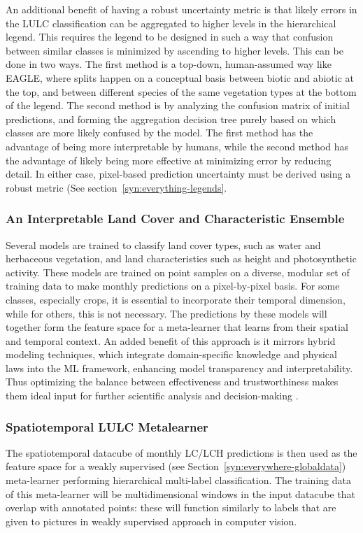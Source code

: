            An additional benefit of having a robust uncertainty metric is that likely errors in the LULC classification can be aggregated to higher levels in the hierarchical legend. This requires the legend to be designed in such a way that confusion between similar classes is minimized by ascending to higher levels. This can be done in two ways. The first method is a top-down, human-assumed way like EAGLE, where splits happen on a conceptual basis between biotic and abiotic at the top, and between different species of the same vegetation types at the bottom of the legend. The second method is by analyzing the confusion matrix of initial predictions, and forming the aggregation decision tree purely based on which classes are more likely confused by the model. The first method has the advantage of being more interpretable by humans, while the second method has the advantage of likely being more effective at minimizing error by reducing detail. In either case, pixel-based prediction uncertainty must be derived using a robust metric (See section\@~\ref{syn:everything-legends}.

        \subsubsection{An Interpretable Land Cover and Characteristic Ensemble}
            Several models are trained to classify land cover types, such as water and herbaceous vegetation, and land characteristics such as height and photosynthetic activity. These models are trained on point samples on a diverse, modular set of training data to make monthly predictions on a pixel-by-pixel basis. For some classes, especially crops, it is essential to incorporate their temporal dimension, while for others, this is not necessary. The predictions by these models will together form the feature space for a meta-learner that learns from their spatial and temporal context. 
            An added benefit of this approach is it mirrors hybrid modeling techniques, which integrate domain-specific knowledge and physical laws into the ML framework, enhancing model transparency and interpretability. Thus optimizing the balance between effectiveness and trustworthiness makes them ideal input for further scientific analysis and decision-making \citep{ferchichi2022forecasting}.

        \subsubsection{Spatiotemporal LULC Metalearner}
            The spatiotemporal datacube of monthly LC/LCH predictions is then used as the feature space for a weakly supervised (see Section\@~\ref{syn:everywhere-globaldata}) meta-learner performing hierarchical multi-label classification. The training data of this meta-learner will be multidimensional windows in the input datacube that overlap with annotated points: these will function similarly to labels that are given to pictures in weakly supervised approach in computer vision. 
            
